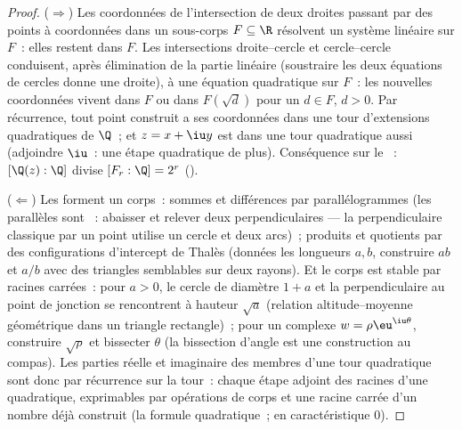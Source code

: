 \begin{proof}
($\Rightarrow$) Les coordonnées de l'intersection de deux droites
passant par des points à coordonnées dans un sous-corps $F
\subseteq \R$ résolvent un système linéaire sur $F$~: elles
restent dans $F$. Les intersections droite--cercle et
cercle--cercle conduisent, après élimination de la partie
linéaire (soustraire les deux équations de cercles donne une
droite), à une équation quadratique sur $F$~: les nouvelles
coordonnées vivent dans $F$ ou dans $F(\sqrt d)$ pour un $d \in
F$, $d > 0$. Par récurrence, tout point construit a ses
coordonnées dans une tour d'extensions quadratiques de $\Q$~; et
$z = x + \iu y$ est dans une tour quadratique aussi (adjoindre
$\iu$~: une étape quadratique de plus). Conséquence sur le
~: $[\Q(z):\Q]$ divise $[F_r : \Q] = 2^r$ ().

($\Leftarrow$) Les  forment un corps~: sommes
et différences par parallélogrammes (les parallèles sont
~: abaisser et relever deux perpendiculaires ---
la perpendiculaire classique par un point utilise un cercle et
deux arcs)~; produits et quotients par des configurations
d'intercept de Thalès (données les longueurs $a, b$, construire
$ab$ et $a/b$ avec des triangles semblables sur deux rayons).
Et le corps est stable par racines carrées~: pour $a > 0$, le
cercle de diamètre $1 + a$ et la perpendiculaire au point de
jonction se rencontrent à hauteur $\sqrt a$ (relation
altitude--moyenne géométrique dans un triangle rectangle)~; pour
un complexe $w = \rho\eu^{\iu\theta}$, construire $\sqrt\rho$ et
bissecter $\theta$ (la bissection d'angle est une construction
au compas). Les parties réelle et imaginaire des membres d'une
tour quadratique sont donc  par récurrence sur
la tour~: chaque étape adjoint des racines d'une quadratique,
exprimables par opérations de corps et une racine carrée d'un
nombre déjà construit (la formule quadratique~; en
caractéristique $0$).
\end{proof}

